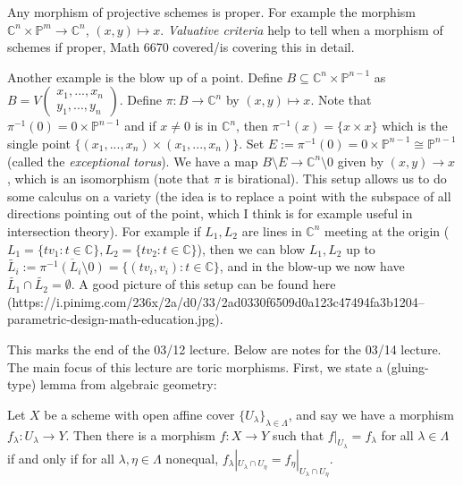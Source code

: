 \documentclass[a4paper,12pt]{amsart}
\newcommand{\C}{\ensuremath{\mathbb{C}}}
\begin{document}
\begin{example}
Any morphism of projective schemes is proper. For example the morphism $\C^n \times \mathbb{P}^m \to \C^n$, $(x,y) \mapsto x$. \emph{Valuative criteria} help to tell when a morphism of schemes if proper, Math 6670 covered/is covering this in detail. 
\end{example}
\begin{example}
Another example is the blow up of a point. Define $B \subseteq \C^n \times \mathbb{P}^{n-1}$ as $B = V \begin{pmatrix} x_1, ..., x_n \\ y_1,...,y_n \end{pmatrix}$. Define $\pi: B \to \C^n$ by $(x,y) \mapsto x$. Note that $\pi^{-1}(0) = 0 \times \mathbb{P}^{n-1}$ and if $x \neq 0$ is in $\C^n$, then $\pi^{-1}(x) = \{x \times x\}$ which is the single point $\{ (x_1,...,x_n) \times (x_1,...,x_n)\}$. Set $E := \pi^{-1}(0) = 0 \times \mathbb{P}^{n-1} \cong \mathbb{P}^{n-1}$ (called the \emph{exceptional torus}). We have a map $B \setminus E \to \C^n \setminus 0$ given by $(x,y) \to x$, which is an isomorphism (note that $\pi$ is birational). This setup allows us to do some calculus on a variety (the idea is to replace a point with the subspace of all directions pointing out of the point, which I think is for example useful in intersection theory). For example if $L_1, L_2$ are lines in $\C^n$ meeting at the origin ($L_1 = \{t v_1 : t \in \C\}, L_2 = \{t v_2 : t \in \C\}$), then we can blow $L_1, L_2$ up to $\widetilde{L_i} := \overline{\pi^{-1}(L_i \setminus 0)} = \{ (tv_i, v_i) : t\in \C\}$, and in the blow-up we now have $\widetilde{L_1} \cap \widetilde{L_2} = \emptyset$. A good picture of this setup can be found here (https://i.pinimg.com/236x/2a/d0/33/2ad0330f6509d0a123c47494fa3b1204--parametric-design-math-education.jpg). 
\end{example} 
\noindent This marks the end of the 03/12 lecture. Below are notes for the 03/14 lecture. The main focus of this lecture are toric morphisms. First, we state a (gluing-type) lemma from algebraic geometry:
\begin{Lemma}
    Let $X$ be a scheme with open affine cover $\{U_\lambda\}_{\lambda \in \Lambda}$, and say we have a morphism $f_\lambda: U_\lambda \to Y$. Then there is a morphism $f: X \to Y$ such that $f|_{U_\lambda} = f_\lambda$ for all $\lambda \in \Lambda$ if and only if for all $\lambda, \eta \in \Lambda$ nonequal, $f_\lambda |_{U_\lambda \cap U_\eta} = f_\eta |_{U_\lambda \cap U_\eta}$.
\end{Lemma}
\end{document}
